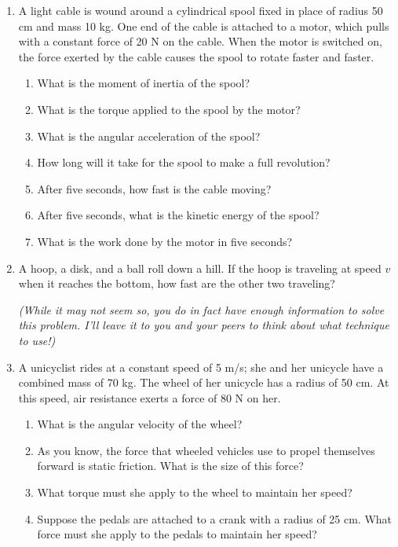 \documentclass[12pt]{article}
\begin{document}
\Large
\centerline{}
\normalsize
\centerline{}

\begin{enumerate}
  \item{A light cable is wound around a cylindrical spool fixed in place of radius 50 cm and mass 10 kg. One end of the cable is attached to a motor, which pulls with a constant force of 20 N on the cable. When the motor is switched on, the force exerted by the cable causes the spool to rotate faster and faster.}
    \begin{enumerate}
      \item{What is the moment of inertia of the spool?}
      \item{What is the torque applied to the spool by the motor?}
      \item{What is the angular acceleration of the spool?}
      \item{How long will it take for the spool to make a full revolution?}
      \item{After five seconds, how fast is the cable moving?}
      \item{After five seconds, what is the kinetic energy of the spool?}
      \item{What is the work done by the motor in five seconds?}
     \end{enumerate}
 
   \item{A hoop, a disk, and a ball roll down a hill. If the hoop is traveling at speed $v$ when it reaches the bottom, how fast are the other two traveling?

       {\em (While it may not seem so, you do in fact have enough information to solve this problem. I'll leave it to you and your peers to think about what technique to use!)}
     }


   \item{A unicyclist rides at a constant speed of 5 m/s; she and her unicycle have a combined mass of 70 kg. The wheel of her unicycle has a radius of 50 cm. At this speed, air resistance exerts a force of 80 N on her.}
     \begin{enumerate}
       \item{What is the angular velocity of the wheel?}
       \item{As you know, the force that wheeled vehicles use to propel themselves forward is static friction. What is the size of this force?}
       \item{What torque must she apply to the wheel to maintain her speed?}
       \item{Suppose the pedals are attached to a crank with a radius of 25 cm. What force must she apply to the pedals to maintain her speed?}
     \end{enumerate}


\end{enumerate}
\end{document}
